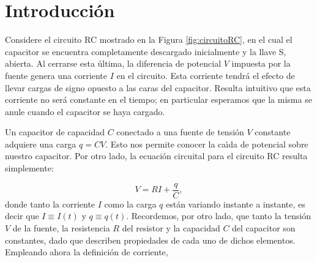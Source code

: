 \documentclass[laboratorio]{guia}
\begin{document}
 
\maketitle

\section{Introducci\'on}

Considere el circuito RC mostrado en la Figura \ref{fig:circuitoRC}, en el
cual el capacitor se encuentra completamente descargado inicialmente y la
llave S, abierta. Al cerrarse esta \'ultima, la diferencia de potencial
$V$ impuesta por la fuente genera una corriente $I$ en el circuito. Esta 
corriente tendr\'a el efecto de llevar cargas de signo opuesto a las caras 
del capacitor. Resulta intuitivo que esta corriente no ser\'a constante en el tiempo; 
en particular esperamos que la misma se anule cuando el capacitor se haya
cargado. 


Un capacitor de capacidad $C$ conectado a una fuente de tensi\'on $V$ constante 
adquiere una carga $q = C V$. Esto nos permite conocer la ca\'\i da de
potencial sobre nuestro capacitor. Por otro lado, la ecuaci\'on circuital para
el circuito RC resulta simplemente:

\begin{equation}
    V = RI + \frac{q}{C},
\end{equation}
donde tanto la corriente $I$ como la carga $q$ est\'an variando instante a
instante, es decir que $I \equiv I(t)$ y $q \equiv q(t)$. Recordemos, por otro
lado, que tanto la tensi\'on $V$ de la fuente, la resistencia $R$ del resistor
y la capacidad $C$ del capacitor son constantes, dado que describen propiedades de
cada uno de dichos elementos. Empleando ahora la definici\'on de corriente,
\end{document}
